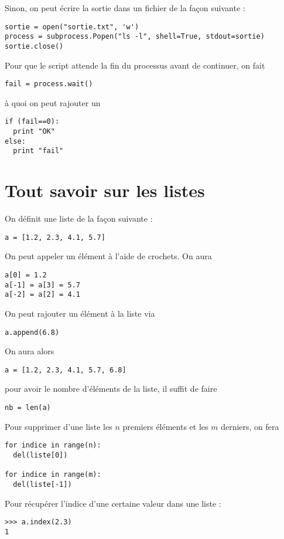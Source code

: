 \documentclass[a4paper,twoside]{article}
\begin{document}
Sinon, on peut écrire la sortie dans un fichier de la façon suivante :
\begin{verbatim}
sortie = open("sortie.txt", 'w')
process = subprocess.Popen("ls -l", shell=True, stdout=sortie)
sortie.close()
\end{verbatim}

Pour que le script attende la fin du processus avant de continuer, on fait
\begin{verbatim}
fail = process.wait()
\end{verbatim}
à quoi on peut rajouter un
\begin{verbatim}
if (fail==0):
  print "OK"
else:
  print "fail"
\end{verbatim}









\section{Tout savoir sur les listes}
On définit une liste de la façon suivante :
\begin{verbatim}
a = [1.2, 2.3, 4.1, 5.7]
\end{verbatim}

On peut appeler un élément à l'aide de crochets. On aura
\begin{verbatim}
a[0] = 1.2
a[-1] = a[3] = 5.7
a[-2] = a[2] = 4.1
\end{verbatim}

On peut rajouter un élément à la liste via
\begin{verbatim}
a.append(6.8)
\end{verbatim}
On aura alors
\begin{verbatim}
a = [1.2, 2.3, 4.1, 5.7, 6.8]
\end{verbatim}

pour avoir le nombre d'éléments de la liste, il suffit de faire
\begin{verbatim}
nb = len(a)
\end{verbatim}

Pour supprimer d'une liste les $n$ premiers éléments et les $m$ derniers, on fera
\begin{verbatim}
for indice in range(n):
  del(liste[0])

for indice in range(m):
  del(liste[-1])
\end{verbatim}

Pour récupérer l'indice d'une certaine valeur dans une liste :
\begin{verbatim}
>>> a.index(2.3)
1
\end{verbatim}
\end{document}
